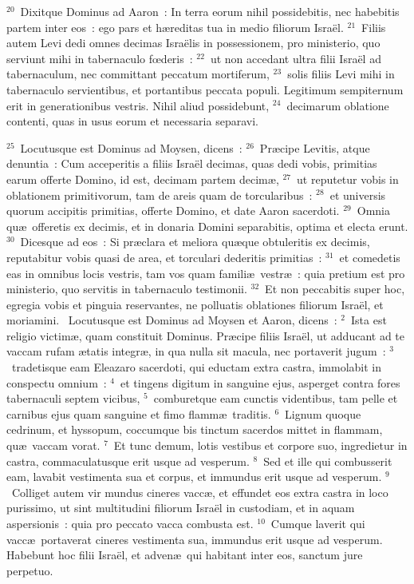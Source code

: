 ${}^{20}$~Dixitque Dominus ad Aaron~: In terra eorum nihil possidebitis, nec habebitis partem inter eos~: ego pars et h\ae reditas tua in medio filiorum Isra\"el.
${}^{21}$~Filiis autem Levi dedi omnes decimas Isra\"elis in possessionem, pro ministerio, quo serviunt mihi in tabernaculo fœderis~:
${}^{22}$~ut non accedant ultra filii Isra\"el ad tabernaculum, nec committant peccatum mortiferum,
${}^{23}$~solis filiis Levi mihi in tabernaculo servientibus, et portantibus peccata populi. Legitimum sempiternum erit in generationibus vestris. Nihil aliud possidebunt,
${}^{24}$~decimarum oblatione contenti, quas in usus eorum et necessaria separavi.


${}^{25}$~Locutusque est Dominus ad Moysen, dicens~:
${}^{26}$~Pr\ae cipe Levitis, atque denuntia~: Cum acceperitis a filiis Isra\"el decimas, quas dedi vobis, primitias earum offerte Domino, id est, decimam partem decim\ae ,
${}^{27}$~ut reputetur vobis in oblationem primitivorum, tam de areis quam de torcularibus~:
${}^{28}$~et universis quorum accipitis primitias, offerte Domino, et date Aaron sacerdoti.
${}^{29}$~Omnia qu\ae\ offeretis ex decimis, et in donaria Domini separabitis, optima et electa erunt.
${}^{30}$~Dicesque ad eos~: Si pr\ae clara et meliora qu\ae que obtuleritis ex decimis, reputabitur vobis quasi de area, et torculari dederitis primitias~:
${}^{31}$~et comedetis eas in omnibus locis vestris, tam vos quam famili\ae\ vestr\ae~: quia pretium est pro ministerio, quo servitis in tabernaculo testimonii.
${}^{32}$~Et non peccabitis super hoc, egregia vobis et pinguia reservantes, ne polluatis oblationes filiorum Isra\"el, et moriamini.
~Locutusque est Dominus ad Moysen et Aaron, dicens~:
${}^{2}$~Ista est religio victim\ae , quam constituit Dominus. Pr\ae cipe filiis Isra\"el, ut adducant ad te vaccam rufam \ae tatis integr\ae , in qua nulla sit macula, nec portaverit jugum~:
${}^{3}$~tradetisque eam Eleazaro sacerdoti, qui eductam extra castra, immolabit in conspectu omnium~:
${}^{4}$~et tingens digitum in sanguine ejus, asperget contra fores tabernaculi septem vicibus,
${}^{5}$~comburetque eam cunctis videntibus, tam pelle et carnibus ejus quam sanguine et fimo flamm\ae\ traditis.
${}^{6}$~Lignum quoque cedrinum, et hyssopum, coccumque bis tinctum sacerdos mittet in flammam, qu\ae\ vaccam vorat.
${}^{7}$~Et tunc demum, lotis vestibus et corpore suo, ingredietur in castra, commaculatusque erit usque ad vesperum.
${}^{8}$~Sed et ille qui combusserit eam, lavabit vestimenta sua et corpus, et immundus erit usque ad vesperum.
${}^{9}$~Colliget autem vir mundus cineres vacc\ae , et effundet eos extra castra in loco purissimo, ut sint multitudini filiorum Isra\"el in custodiam, et in aquam aspersionis~: quia pro peccato vacca combusta est.
${}^{10}$~Cumque laverit qui vacc\ae\ portaverat cineres vestimenta sua, immundus erit usque ad vesperum. Habebunt hoc filii Isra\"el, et adven\ae\ qui habitant inter eos, sanctum jure perpetuo.


